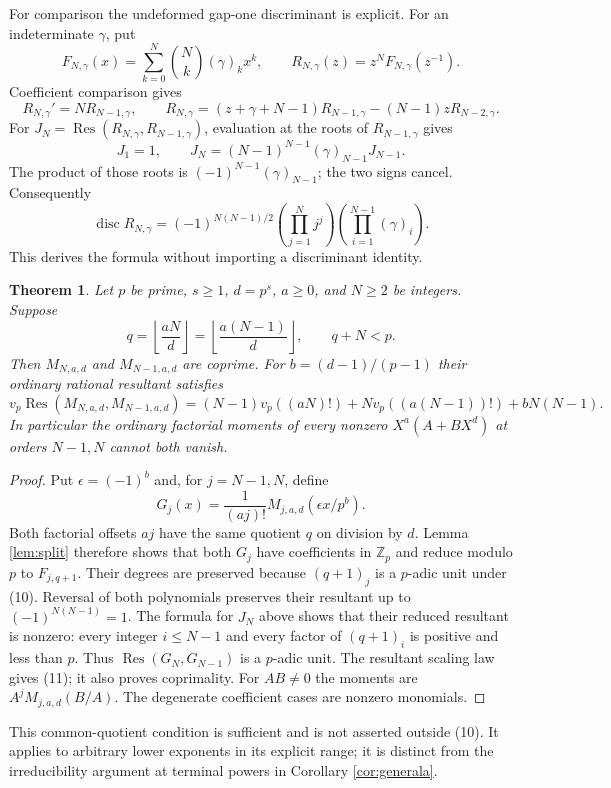 \documentclass[11pt]{article}
\newtheorem{theorem}{Theorem}
\begin{document}
For comparison the undeformed gap-one discriminant is explicit.
For an indeterminate $\gamma$, put
\[
 F_{N,\gamma}(x)=\sum_{k=0}^N\binom Nk(\gamma)_k x^k,\qquad
 R_{N,\gamma}(z)=z^N F_{N,\gamma}(z^{-1}).
\]
Coefficient comparison gives
\[
 R_{N,\gamma}'=N R_{N-1,\gamma},\qquad
 R_{N,\gamma}=(z+\gamma+N-1)R_{N-1,\gamma}
                    -(N-1)zR_{N-2,\gamma}.
\]
For $J_N=\operatorname{Res}(R_{N,\gamma},R_{N-1,\gamma})$,
evaluation at the roots of $R_{N-1,\gamma}$ gives
\[
 J_1=1,\qquad
 J_N=(N-1)^{N-1}(\gamma)_{N-1}J_{N-1}.
\]
The product of those roots is
$(-1)^{N-1}(\gamma)_{N-1}$; the two signs cancel.
Consequently
\[
 \operatorname{disc}R_{N,\gamma}
 =(-1)^{N(N-1)/2}
    \left(\prod_{j=1}^N j^j\right)
    \left(\prod_{i=1}^{N-1}(\gamma)_i\right).                 \tag{9}
\]
This derives the formula without importing a discriminant identity.

\begin{theorem}\label{thm:commonquotient}
Let $p$ be prime, $s\ge1$, $d=p^s$, $a\ge0$, and $N\ge2$
be integers. Suppose
\[
 q=\left\lfloor\frac{aN}{d}\right\rfloor
  =\left\lfloor\frac{a(N-1)}d\right\rfloor,\qquad q+N<p.       \tag{10}
\]
Then $M_{N,a,d}$ and $M_{N-1,a,d}$ are coprime.
For $b=(d-1)/(p-1)$ their ordinary rational resultant satisfies
\[
 v_p\operatorname{Res}(M_{N,a,d},M_{N-1,a,d})
 =(N-1)v_p((aN)!)+Nv_p((a(N-1))!)+bN(N-1).                 \tag{11}
\]
In particular the ordinary factorial moments of every nonzero
$X^a(A+BX^d)$ at orders $N-1,N$ cannot both vanish.
\end{theorem}
\begin{proof}
Put $\epsilon=(-1)^b$ and, for $j=N-1,N$, define
\[
 G_j(x)=\frac{1}{(aj)!}M_{j,a,d}(\epsilon x/p^b).
\]
Both factorial offsets $aj$ have the same quotient $q$ on division
by $d$. Lemma \ref{lem:split} therefore shows that both $G_j$
have coefficients in $\mathbb Z_p$ and reduce modulo $p$ to
$F_{j,q+1}$.
Their degrees are preserved because
$(q+1)_j$ is a $p$-adic unit under (10).
Reversal of both polynomials preserves their resultant up to
$(-1)^{N(N-1)}=1$.
The formula for $J_N$ above shows that their reduced resultant is
nonzero: every integer $i\le N-1$ and every factor of
$(q+1)_i$ is positive and less than $p$.
Thus $\operatorname{Res}(G_N,G_{N-1})$ is a $p$-adic unit.
The resultant scaling law gives (11); it also proves coprimality.
For $AB\ne0$ the moments are
$A^jM_{j,a,d}(B/A)$. The degenerate coefficient cases are nonzero
monomials.
\end{proof}
This common-quotient condition is sufficient and is not asserted
outside (10). It applies to arbitrary lower exponents in its
explicit range; it is distinct from the irreducibility argument
at terminal powers in Corollary \ref{cor:generala}.
\end{document}
